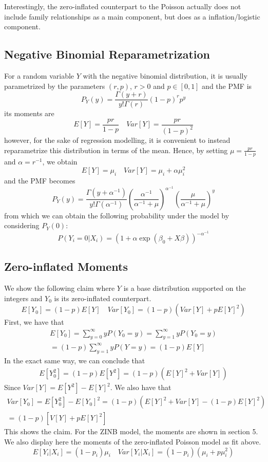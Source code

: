 \documentclass[12pt, titlepage]{article}
\begin{document}
	Interestingly, the zero-inflated counterpart to the Poisson actually does not include family relationships as a main component, but does as a inflation/logistic component.
	
	\subsection*{Negative Binomial Reparametrization}
	For a random variable $Y$ with the negative binomial distribution, it is usually parametrized by the parameters $(r,p)$, $r>0$ and $p\in[0,1]$ and the PMF is
	$$
	P_Y(y) = \frac{\Gamma(y+r)}{y!\Gamma(r)}(1-p)^{r}p^{y}
	$$
	its moments are
	$$
	E[Y] = \frac{pr}{1-p} \quad Var[Y] = \frac{pr}{(1-p)^2}
	$$
	however, for the sake of regression modelling, it is convenient to instead reparametrize this distribution in terms of the mean. Hence, by setting $\mu = \frac{pr}{1-p}$ and $\alpha = r^{-1}$, we obtain
	$$
	E[Y] = \mu_i \quad Var[Y] = \mu_i + \alpha\mu_i^2
	$$
	and the PMF becomes
	$$
	P_Y(y) = \frac{\Gamma(y + \alpha^{-1})}{y!\Gamma(\alpha^{-1})}\left(\frac{\alpha^{-1}}{\alpha^{-1} + \mu} \right)^{\alpha^{-1}}\left(\frac{\mu}{\alpha^{-1} + \mu} \right)^y
	$$
	from which we can obtain the following probability under the model by considering $P_Y(0)$:
	$$
	P(Y_i = 0 | X_i) = (1 + \alpha \exp(\beta_0 + X\beta))^{-\alpha^{-1}}
	$$
	\subsection*{Zero-inflated Moments}
	We show the following claim where $Y$ is a base distribution supported on the integers and $Y_0$ is its zero-inflated counterpart.
	$$
	E[Y_0] = (1-p)E[Y] \quad Var[Y_0] = (1-p)(Var[Y] + pE[Y]^2)
	$$
	First, we have that
	\begin{gather*}
		E[Y_0] = \sum_{y=0}^{\infty} yP(Y_0 = y) = \sum_{y=1}^{\infty} yP(Y_0 = y) \\
		= (1-p)\sum_{y=1}^{\infty}yP(Y=y) = (1-p)E[Y]
	\end{gather*}
	In the exact same way, we can conclude that
	\begin{gather*}
		E[Y_0^2] = (1-p)E[Y^2] = (1-p)(E[Y]^2 + Var[Y])
	\end{gather*}
	Since $Var[Y] = E[Y^2] - E[Y]^2$. We also have that
	\begin{gather*}
		Var[Y_0] = E[Y_0^2] - E[Y_0]^2 = (1-p)(E[Y]^2 + Var[Y] - (1-p)E[Y]^2) \\
		= (1-p)[V[Y] + pE[Y]^2]
	\end{gather*}
	This shows the claim. For the ZINB model, the moments are shown in section 5. We also display here the moments of the zero-inflated Poisson model as fit above. 
	$$
	E[Y_i|X_i] = (1-p_i)\mu_i \quad  Var[Y_i|X_i] = (1-p_i)(\mu_i + p\mu_i^2)
	$$
\end{document}
